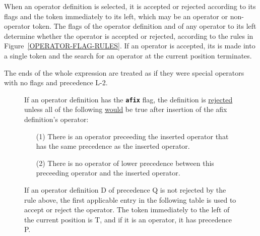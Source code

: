 \documentclass[12pt]{article}
\makeatletter
\newcommand{\TT}[1]{{\tt \bfseries #1}}
\newcommand{\ttkey}[1]{\TT{#1}\index{#1@\TT{#1}}}
\newlength{\figurewidth}
\newenvironment{boxedfigure}[1][!btp]%
	{\begin{figure*}[#1]
	 \begin{lrbox}{\figurebox}
	 \begin{minipage}{\figurewidth}

	 \vspace*{1ex}}%
	{
	 \vspace*{1ex}

	 \end{minipage}
	 \end{lrbox}

	 \centering
	 \fbox{\hspace*{0.1in}\usebox{\figurebox}\hspace*{0.1in}}
	 \end{figure*}}
\makeatother
\begin{document}
When an operator definition is selected, it is accepted or rejected
according to its flags and the token immediately to its left, which
may be an operator or non-operator token.  The flags of the operator
definition and of any operator to its left determine whether the
operator is accepted or rejected, according to the rules in
Figure~\ref{OPERATOR-FLAG-RULES}.  If an operator is accepted,
its is made into a single token and the search for an operator
at the current position terminates.

The ends of the whole expression are treated as if they were
special operators with no flags and precedence L-2.

\begin{boxedfigure}[!t]

If an operator definition has the \ttkey{afix} flag,
the definition
is \underline{rejected} unless all of the following \underline{would} be true
after insertion of the afix definition's operator:
\begin{itemize}
\item[(1)] There is an operator preceeding the inserted operator
that has the same precedence as the inserted operator.
\item[(2)] There is no
operator of lower precedence between this preceeding operator
and the inserted operator.
\end{itemize}

If an operator definition D of precedence Q is not rejected
by the rule above,
the first applicable entry in the following table is used
to accept or reject the operator.
The token immediately to the left of the current position
is T, and if it is an operator, it has precedence P.


\end{boxedfigure}
\end{document}
